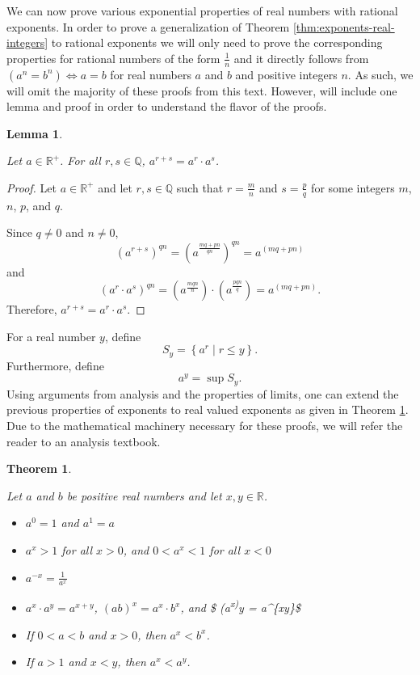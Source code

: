 \documentclass[
]{book}
\newtheorem{theorem}{Theorem}[chapter]
\newtheorem{lemma}{Lemma}[chapter]
\theoremstyle{definition}
\theoremstyle{definition}
\theoremstyle{definition}
\theoremstyle{definition}
\theoremstyle{remark}
\begin{document}
We can now prove various exponential properties of real numbers with rational exponents. In order to prove a generalization of Theorem \ref{thm:exponents-real-integers} to rational exponents we will only need to prove the corresponding properties for rational numbers of the form \(\frac{1}{n}\) and it directly follows from \((a^n=b^n) \Leftrightarrow a=b\) for real numbers \(a\) and \(b\) and positive integers \(n\). As such, we will omit the majority of these proofs from this text. However, will include one lemma and proof in order to understand the flavor of the proofs.

\begin{lemma}
\protect\hypertarget{lem:unlabeled-div-59}{}\label{lem:unlabeled-div-59}

Let \(a\in \mathbb{R}^+\). For all \(r,s\in \mathbb{Q}\), \(a^{r+s}=a^r\cdot a^s\).

\end{lemma}

\begin{proof}

Let \(a\in \mathbb{R}^+\) and let \(r,s\in \mathbb{Q}\) such that \(r=\frac{m}{n}\) and \(s=\frac{p}{q}\) for some integers \(m\), \(n\), \(p\), and \(q\).

Since \(q\neq 0\) and \(n\neq 0\),
\[\left(a^{r+s}\right)^{qn} = \left( a^{\frac{mq+pn}{qn}}\right)^{qn} = a^{(mq+pn)}\] and
\[\left(a^r\cdot a^s\right)^{qn} = \left(a^{\frac{mqn}{n}}\right)\cdot \left(a^{\frac{pqn}{q}}\right) = a^{(mq+pn)}.\] Therefore, \(a^{r+s}=a^r\cdot a^s\).

\end{proof}

For a real number \(y\), define \[S_y= \left\{ a^r \middle \vert r \leq y\right\}.\] Furthermore, define \[a^y = \sup S_y.\] Using arguments from analysis and the properties of limits, one can extend the previous properties of exponents to real valued exponents as given in Theorem \ref{thm:exponents-reals}. Due to the mathematical machinery necessary for these proofs, we will refer the reader to an analysis textbook.

\begin{theorem}
\protect\hypertarget{thm:exponents-reals}{}\label{thm:exponents-reals}

Let \(a\) and \(b\) be positive real numbers and let \(x,y\in \mathbb{R}\).

\begin{itemize}
\item
  \(a^0=1\) and \(a^1=a\)
\item
  \(a^x >1\) for all \(x>0\), and \(0<a^x<1\) for all \(x<0\)
\item
  \(a^{-x} = \frac{1}{a^x}\)
\item
  \(a^x\cdot a^y = a^{x+y}\), \((ab)^x=a^x\cdot b^x\), and \$ (a\textsuperscript{x)}y = a\^{}\{xy\}\$
\item
  If \(0<a<b\) and \(x>0\), then \(a^x<b^x\).
\item
  If \(a>1\) and \(x<y\), then \(a^x<a^y\).
\end{itemize}

\end{theorem}
\end{document}

